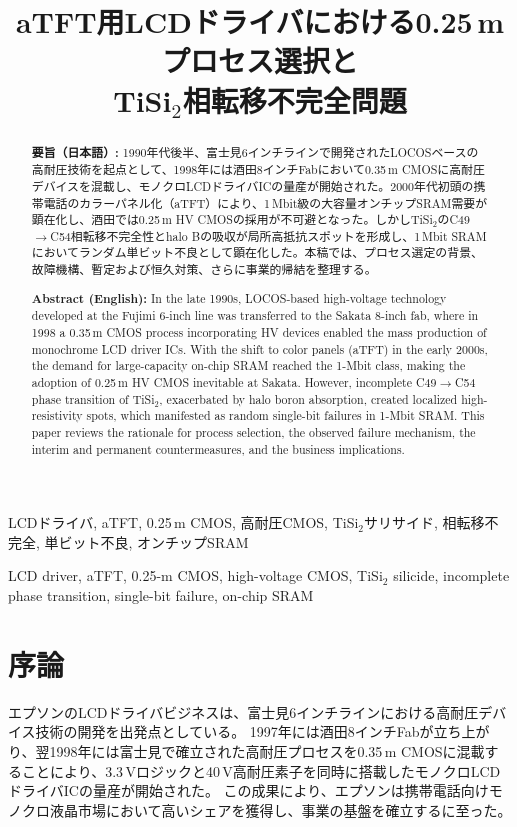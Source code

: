\documentclass[conference]{IEEEtran}
\title{aTFT用LCDドライバにおける0.25\,\textmu mプロセス選択と\\
TiSi$_2$相転移不完全問題}
\author{%
  \IEEEauthorblockN{三溝 真一 (Shinichi Samizo)}%
  \IEEEauthorblockA{独立系半導体研究者（元セイコーエプソン）\\%
  Independent Semiconductor Researcher (ex-Seiko Epson)\\%
  Email: \href{mailto:shin3t72@gmail.com}{shin3t72@gmail.com}\\%
  GitHub: \url{https://github.com/Samizo-AITL}}%
}
\begin{document}
\maketitle

\begin{abstract}
\noindent\textbf{要旨（日本語）:}  
1990年代後半、富士見6インチラインで開発されたLOCOSベースの高耐圧技術を起点として、1998年には酒田8インチFabにおいて0.35\,\textmu m CMOSに高耐圧デバイスを混載し、モノクロLCDドライバICの量産が開始された。2000年代初頭の携帯電話のカラーパネル化（aTFT）により、1\,Mbit級の大容量オンチップSRAM需要が顕在化し、酒田では0.25\,\textmu m HV CMOSの採用が不可避となった。しかしTiSi$_2$のC49$\to$C54相転移不完全性とhalo Bの吸収が局所高抵抗スポットを形成し、1\,Mbit SRAMにおいてランダム単ビット不良として顕在化した。本稿では、プロセス選定の背景、故障機構、暫定および恒久対策、さらに事業的帰結を整理する。  

\vspace{1ex}
\noindent\textbf{Abstract (English):}  
In the late 1990s, LOCOS-based high-voltage technology developed at the Fujimi 6-inch line was transferred to the Sakata 8-inch fab, where in 1998 a 0.35\,\textmu m CMOS process incorporating HV devices enabled the mass production of monochrome LCD driver ICs. With the shift to color panels (aTFT) in the early 2000s, the demand for large-capacity on-chip SRAM reached the 1-Mbit class, making the adoption of 0.25\,\textmu m HV CMOS inevitable at Sakata. However, incomplete C49$\to$C54 phase transition of TiSi$_2$, exacerbated by halo boron absorption, created localized high-resistivity spots, which manifested as random single-bit failures in 1-Mbit SRAM. This paper reviews the rationale for process selection, the observed failure mechanism, the interim and permanent countermeasures, and the business implications.
\end{abstract}

\begin{IEEEkeywords}
LCDドライバ, aTFT, 0.25\,\textmu m CMOS, 高耐圧CMOS, TiSi$_2$サリサイド, 相転移不完全, 単ビット不良, オンチップSRAM
\end{IEEEkeywords}

\begin{IEEEkeywords}
LCD driver, aTFT, 0.25-\textmu m CMOS, high-voltage CMOS, TiSi$_2$ silicide, incomplete phase transition, single-bit failure, on-chip SRAM
\end{IEEEkeywords}

\section{序論}
エプソンのLCDドライバビジネスは、富士見6インチラインにおける高耐圧デバイス技術の開発を出発点としている。  
1997年には酒田8インチFabが立ち上がり、翌1998年には富士見で確立された高耐圧プロセスを0.35\,\textmu m CMOSに混載することにより、3.3\,Vロジックと40\,V高耐圧素子を同時に搭載したモノクロLCDドライバICの量産が開始された。  
この成果により、エプソンは携帯電話向けモノクロ液晶市場において高いシェアを獲得し、事業の基盤を確立するに至った。  
\end{document}
